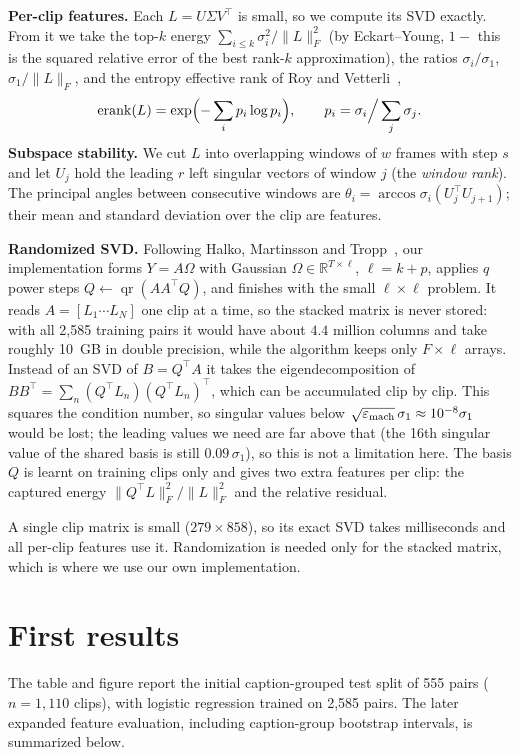 \documentclass[11pt,a4paper]{article}
\theoremstyle{plain}
\theoremstyle{definition}
\theoremstyle{remark}
\begin{document}
\textbf{Per-clip features.} Each $L=U\Sigma V^\top$ is small, so we compute its
SVD exactly. From it we take the top-$k$ energy
$\sum_{i\le k}\sigma_i^2/\|L\|_F^2$ (by Eckart--Young, $1-$ this is the squared
relative error of the best rank-$k$ approximation), the ratios
$\sigma_i/\sigma_1$, $\sigma_1/\|L\|_F$, and the entropy effective rank of Roy
and Vetterli~\cite{RoyVetterli},
\[
  \operatorname{erank}(L)=\exp\Bigl(-\sum_i p_i\log p_i\Bigr),\qquad
  p_i=\sigma_i\Big/\sum_j\sigma_j .
\]
\textbf{Subspace stability.} We cut $L$ into overlapping windows of $w$ frames
with step $s$ and let $U_j$ hold the leading $r$ left singular vectors of window
$j$ (the \emph{window rank}). The principal angles between consecutive windows
are $\theta_i=\arccos\sigma_i(U_j^\top U_{j+1})$; their mean and standard
deviation over the clip are features.

\textbf{Randomized SVD.} Following Halko, Martinsson and Tropp~\cite{Halko},
our implementation
forms $Y=A\Omega$ with Gaussian $\Omega\in\mathbb{R}^{T\times\ell}$,
$\ell=k+p$, applies $q$ power steps $Q\leftarrow\operatorname{qr}(AA^\top Q)$,
and finishes with the small $\ell\times\ell$ problem. It reads $A=[L_1\cdots L_N]$
one clip at a time, so the stacked matrix is never stored: with all 2{,}585
training pairs it would have about $4.4$ million columns and take roughly 10~GB
in double precision, while the algorithm keeps only $F\times\ell$ arrays.
Instead of an SVD of $B=Q^\top A$ it takes the eigendecomposition of
$BB^\top=\sum_n (Q^\top L_n)(Q^\top L_n)^\top$, which can be accumulated clip by
clip. This squares the condition number, so singular values below
$\sqrt{\varepsilon_{\rm mach}}\,\sigma_1\approx10^{-8}\sigma_1$ would be lost;
the leading values we need are far above that (the 16th singular value of the
shared basis is still $0.09\,\sigma_1$), so this is not a limitation here. The basis $Q$ is learnt on training clips only and gives two
extra features per clip: the captured energy $\|Q^\top L\|_F^2/\|L\|_F^2$ and
the relative residual.

A single clip matrix is small ($279\times858$), so its exact SVD takes
milliseconds and all per-clip features use it. Randomization is needed only
for the stacked matrix, which is where we use our own implementation.

\section{First results}\label{sec:confound}
The table and figure report the initial caption-grouped test split of 555
pairs ($n=1{,}110$ clips), with logistic regression trained on 2{,}585 pairs.
The later expanded feature evaluation, including caption-group bootstrap
intervals, is summarized below.
\end{document}
